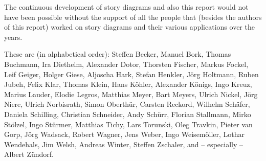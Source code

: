 The continuous development of story diagrams and also this report would not have been possible without the support
of all the people that (besides the authors of this report) worked on story diagrams and their various applications over the years.

These are (in alphabetical order): 
Steffen Becker, Manuel Bork, Thomas Buchmann, 
Ira Diethelm, Alexander Dotor, 
Thorsten Fischer, Markus Fockel,
Leif Geiger, Holger Giese, 
Aljoscha Hark, Stefan Henkler, J\"{o}rg Holtmann,
Ruben Jubeh,
Felix Klar, Thomas Klein, Hans K\"{o}hler, Alexander K\"{o}nigs, Ingo Kreuz, 
Marius Lauder, Elodie Legros,
Matthias Meyer, Bart Meyers, 
Ulrich Nickel, J\"{o}rg Niere, Ulrich Norbisrath,
Simon Oberth\"{u}r, 
Carsten Reckord, 
Wilhelm Sch\"{a}fer, Daniela Schilling, Christian Schneider, Andy Sch\"{u}rr, Florian Stallmann, Mirko St\"{o}lzel, Ingo St\"{u}rmer, 
Matthias Tichy, Lars Torunski, Oleg Travkin, 
Pieter van Gorp, 
J\"{o}rg Wadsack, Robert Wagner, Jens Weber, Ingo Weisem\"{o}ller, Lothar Wendehals, Jim Welsh, Andreas Winter, 
Steffen Zschaler, and -- especially -- Albert Z\"{u}ndorf.

